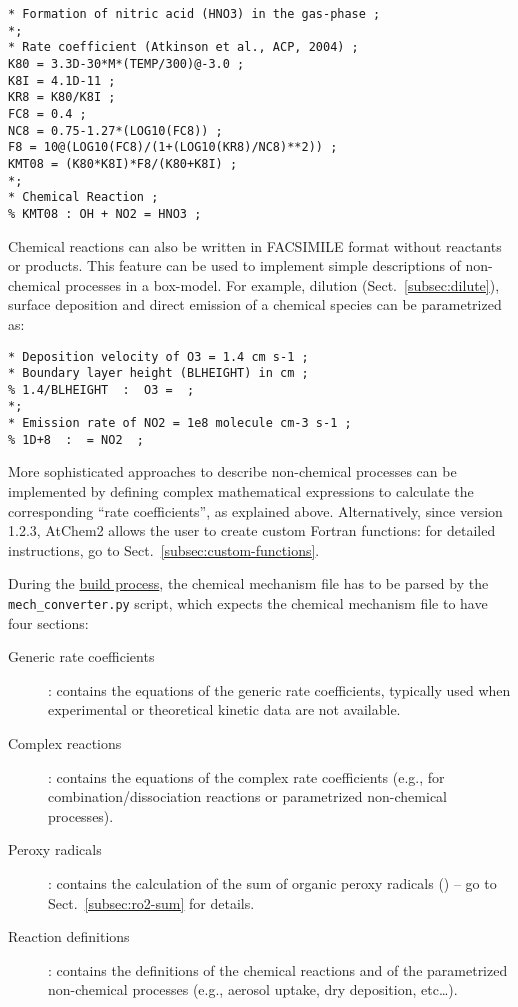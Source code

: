 \begin{verbatim}
* Formation of nitric acid (HNO3) in the gas-phase ;
*;
* Rate coefficient (Atkinson et al., ACP, 2004) ;
K80 = 3.3D-30*M*(TEMP/300)@-3.0 ;
K8I = 4.1D-11 ;
KR8 = K80/K8I ;
FC8 = 0.4 ;
NC8 = 0.75-1.27*(LOG10(FC8)) ;
F8 = 10@(LOG10(FC8)/(1+(LOG10(KR8)/NC8)**2)) ;
KMT08 = (K80*K8I)*F8/(K80+K8I) ;
*;
* Chemical Reaction ;
% KMT08 : OH + NO2 = HNO3 ;
\end{verbatim}

Chemical reactions can also be written in FACSIMILE format without
reactants or products. This feature can be used to implement simple
descriptions of non-chemical processes in a box-model. For example,
dilution (Sect.~\ref{subsec:dilute}), surface deposition and direct
emission of a chemical species can be parametrized as:

\begin{verbatim}
* Deposition velocity of O3 = 1.4 cm s-1 ;
* Boundary layer height (BLHEIGHT) in cm ;
% 1.4/BLHEIGHT  :  O3 =  ;
*;
* Emission rate of NO2 = 1e8 molecule cm-3 s-1 ;
% 1D+8  :  = NO2  ;
\end{verbatim}

More sophisticated approaches to describe non-chemical processes can
be implemented by defining complex mathematical expressions to
calculate the corresponding ``rate coefficients'', as explained above.
Alternatively, since version 1.2.3, AtChem2 allows the user to create
custom Fortran functions: for detailed instructions, go to
Sect.~\ref{subsec:custom-functions}.

During the \hyperref[subsec:build-process]{build process}, the
chemical mechanism file has to be parsed by the \texttt{mech\_converter.py}
script, which expects the chemical mechanism file to have four sections:

\begin{description}
\item[Generic rate coefficients]: contains the equations of the
  generic rate coefficients, typically used when experimental or
  theoretical kinetic data are not available.
\item[Complex reactions]: contains the equations of the complex rate
  coefficients (e.g., for combination/dissociation reactions or
  parametrized non-chemical processes).
\item[Peroxy radicals]: contains the calculation of the sum of organic
  peroxy radicals () -- go to Sect.~\ref{subsec:ro2-sum} for
  details.
\item[Reaction definitions]: contains the definitions of the chemical
  reactions and of the parametrized non-chemical processes (e.g.,
  aerosol uptake, dry deposition, etc\ldots).
\end{description}

